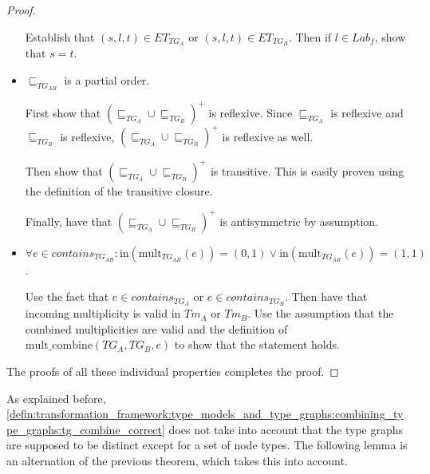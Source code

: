 \begin{proof}
\begin{itemize}
Establish that $(s, l, t) \in ET_{TG_{A}}$ or $(s, l, t) \in ET_{TG_{B}}$. Then if $l \in Lab_f$, show that $s = t$.


\item $\sqsubseteq_{TG_{AB}}$ is a partial order.

First show that $(\sqsubseteq_{TG_A} \cup \sqsubseteq_{TG_B})^+$ is reflexive. Since $\sqsubseteq_{TG_{A}}$ is reflexive and $\sqsubseteq_{TG_{B}}$ is reflexive, $(\sqsubseteq_{TG_A} \cup \sqsubseteq_{TG_B})^+$ is reflexive as well.

Then show that $(\sqsubseteq_{TG_A} \cup \sqsubseteq_{TG_B})^+$ is transitive. This is easily proven using the definition of the transitive closure.

Finally, have that $(\sqsubseteq_{TG_A} \cup \sqsubseteq_{TG_B})^+$ is antisymmetric by assumption.


\item $\forall e \in contains_{TG_{AB}}: \mathrm{in}(\mathrm{mult}_{TG_{AB}}(e)) = (0, 1) \lor \mathrm{in}(\mathrm{mult}_{TG_{AB}}(e)) = (1, 1)$.

Use the fact that $e \in contains_{TG_{A}}$ or $e \in contains_{TG_{B}}$. Then have that incoming multiplicity is valid in $Tm_A$ or $Tm_B$. Use the assumption that the combined multiplicities are valid and the definition of $\mathrm{mult\_\!combine}(TG_{A}, TG_{B}, e)$ to show that the statement holds.
\end{itemize}

The proofs of all these individual properties completes the proof.
\end{proof}

As explained before, \cref{defin:transformation_framework:type_models_and_type_graphs:combining_type_graphs:tg_combine_correct} does not take into account that the type graphs are supposed to be distinct except for a set of node types. The following lemma is an alternation of the previous theorem, which takes this into account.

